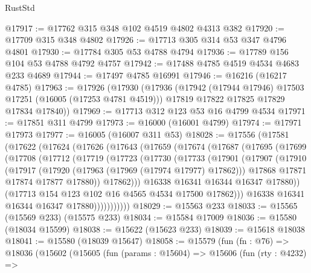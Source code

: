 \begin{lexlean}{RustStd}
\begin{coremodule}
@17917 := @17762 @315 @348 @102 @4519 @4802 @4313 @382
@17920 := @17709 @315 @348 @4802
@17926 := @17713 @305 @314 @53 @347 @4796 @4801
@17930 := @17784 @305 @53 @4788 @4794
@17936 := @17789 @156 @104 @53 @4788 @4792 @4757
@17942 := @17488 @4785 @4519 @4534 @4683 @233 @4689
@17944 := @17497 @4785 @16991
@17946 := @16216 (@16217 @4785)
@17963 := @17926
    (@17930
      (@17936
        (@17942 (@17944 @17946) @17503 @17251 (@16005 (@17253 @4781 @4519)))
        @17819
        @17822
        @17825
        @17829
        @17834
        @17840))
@17969 := @17713 @312 @123 @53 @16 @4799 @4534
@17971 := @17851 @311 @4799
@17973 := @16000 (@16001 @4799)
@17974 := @17971 @17973
@17977 := @16005 (@16007 @311 @53)
@18028 := @17556
    (@17581
      (@17622
        (@17624
          (@17626
            (@17643
              (@17659
                (@17674
                  (@17687
                    (@17695
                      (@17699
                        (@17708
                          (@17712
                            (@17719
                              (@17723
                                (@17730
                                  (@17733
                                    (@17901
                                      (@17907
                                        (@17910
                                          (@17917
                                            (@17920 (@17963 (@17969 (@17974 @17977) @17862)))
                                            @17868
                                            @17871
                                            @17874
                                            @17877
                                            @17880))
                                        @17862)))
                                  @16338
                                  @16341
                                  @16344
                                  @16347
                                  @17880))
                              (@17713 @154 @123 @102 @16 @4565 @4534 @17500 @17862)))
                          @16338
                          @16341
                          @16344
                          @16347
                          @17880)))))))))))
@18029 := @15563 @233
@18033 := @15565 (@15569 @233) (@15575 @233)
@18034 := @15584 @17009
@18036 := @15580 (@18034 @15599)
@18038 := @15622 (@15623 @233)
@18039 := @15618 @18038
@18041 := @15580 (@18039 @15647)
@18058 := @15579
    (fun (fn : @76) =>
    @18036
      (@15602
        (@15605
          (fun (params : @15604) =>
          @15606
            (fun (rty : @4232) =>

\end{coremodule}
\end{lexlean}
